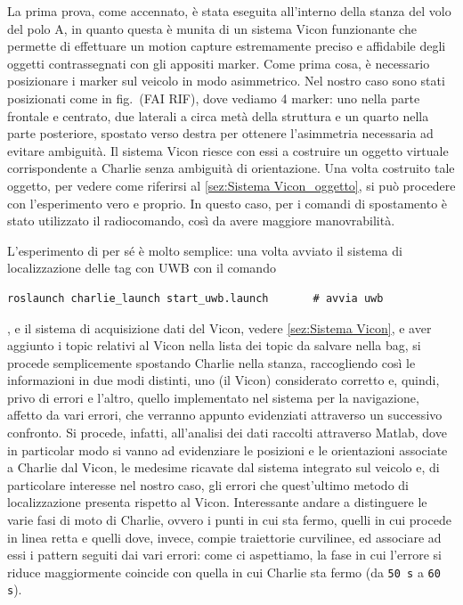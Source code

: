 La prima prova, come accennato, è stata eseguita all'interno della stanza del volo del polo A, in quanto questa è munita di un sistema Vicon funzionante che permette di effettuare un motion capture estremamente preciso e affidabile degli oggetti contrassegnati con gli appositi marker. Come prima cosa, è necessario posizionare i marker sul veicolo in modo asimmetrico. Nel nostro caso sono stati posizionati come in fig.~(FAI RIF), dove vediamo 4 marker: uno nella parte frontale e centrato, due laterali a circa metà della struttura e un quarto nella parte posteriore, spostato verso destra per ottenere l'asimmetria necessaria ad evitare ambiguità. Il sistema Vicon riesce con essi a costruire un oggetto virtuale corrispondente a Charlie senza ambiguità di orientazione. Una volta costruito tale oggetto, per vedere come riferirsi al \ref{sez:Sistema Vicon_oggetto}, si può procedere con l'esperimento vero e proprio. In questo caso, per i comandi di spostamento è stato utilizzato il radiocomando, così da avere maggiore manovrabilità.

L'esperimento di per sé è molto semplice: una volta avviato il sistema di localizzazione delle tag con UWB con il comando \begin{lstlisting}[style=bash]
	roslaunch charlie_launch start_uwb.launch		# avvia uwb
\end{lstlisting}, e il sistema di acquisizione dati del Vicon, vedere \ref{sez:Sistema Vicon}, e aver aggiunto i topic relativi al Vicon nella lista dei topic da salvare nella bag, si procede semplicemente spostando Charlie nella stanza, raccogliendo così le informazioni in due modi distinti, uno (il Vicon) considerato corretto e, quindi, privo di errori e l'altro, quello implementato nel sistema per la navigazione, affetto da vari errori, che verranno appunto evidenziati attraverso un successivo confronto.
Si procede, infatti, all'analisi dei dati raccolti attraverso Matlab, dove in particolar modo si vanno ad evidenziare le posizioni e le orientazioni associate a Charlie dal Vicon, le medesime ricavate dal sistema integrato sul veicolo e, di particolare interesse nel nostro caso, gli errori che quest'ultimo metodo di localizzazione presenta rispetto al Vicon. Interessante andare a distinguere le varie fasi di moto di Charlie, ovvero i punti in cui sta fermo, quelli in cui procede in linea retta e quelli dove, invece, compie traiettorie curvilinee, ed associare ad essi i pattern seguiti dai vari errori: come ci aspettiamo, la fase in cui l'errore si riduce maggiormente coincide con quella in cui Charlie sta fermo (da \verb|50 s| a \verb|60 s|).

